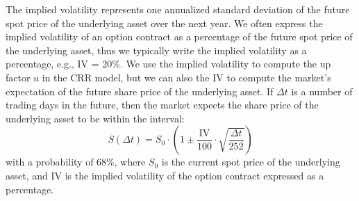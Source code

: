 \documentclass[11pt]{article}
\theoremstyle{definition}
\begin{document}
The implied volatility represents one annualized standard deviation of the future spot price of the underlying asset over the next year.
We often express the implied volatility of an option contract as a percentage of the future spot price of the underlying asset, 
thus we typically write the implied volatility as a percentage, e.g., IV = 20\%. 
We use the implied volatility to compute the up factor $u$ in the CRR model, 
but we can also the IV to compute the market's expectation of the future share price of the underlying asset. 
If $\Delta{t}$ is a number of trading days in the future, then the market expects the share price of the underlying asset to be within the interval:
\begin{equation*}
S(\Delta{t}) = S_{0}\cdot\left(1\pm\frac{\text{IV}}{100}\cdot\sqrt{\frac{\Delta{t}}{252}}\right)
\end{equation*}
with a probability of 68\%, where $S_{0}$ is the current spot price of the underlying asset, 
and $\text{IV}$ is the implied volatility of the option contract expressed as a percentage.
\end{document}

